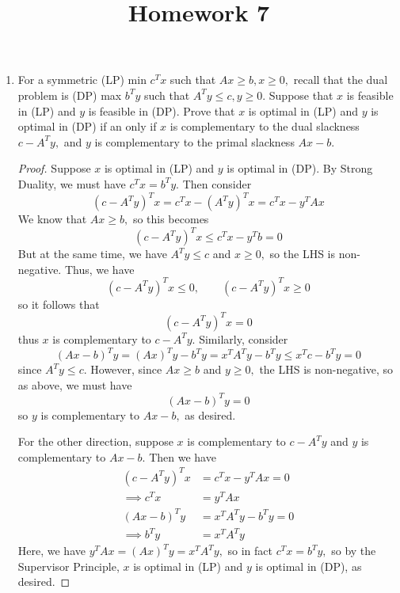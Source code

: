 \documentclass{article}
\begin{document}
\title{Homework 7}
\maketitle
\thispagestyle{fancy}

\begin{enumerate}
	\item For a symmetric (LP) min $c^T x$ such that $Ax\ge b, x\ge 0,$ recall that the dual problem is (DP) max $b^T y$ such that $A^T y\le c, y\ge 0.$ Suppose that $x$ is feasible in (LP) and $y$ is feasible in (DP). Prove that $x$ is optimal in (LP) and $y$ is optimal in (DP) if an only if $x$ is complementary to the dual slackness $c-A^T y,$ and $y$ is complementary to the primal slackness $Ax-b.$
		\begin{proof}
			Suppose $x$ is optimal in (LP) and $y$ is optimal in (DP). By Strong Duality, we must have $c^Tx = b^T y.$ Then consider \[(c-A^T y)^T x = c^Tx - (A^T y)^T x = c^T x - y^T Ax\] We know that $Ax\ge b,$ so this becomes \[(c-A^T y)^T x\le c^T x - y^Tb = 0\] But at the same time, we have $A^Ty\le c$ and $x\ge 0,$ so the LHS is non-negative. Thus, we have \[(c-A^T y)^T x \le 0, \quad\quad (c-A^Ty)^T x\ge 0\] so it follows that \[(c-A^Ty)^T x = 0\] thus $x$ is complementary to $c-A^T y.$
			Similarly, consider \[(Ax-b)^T y = (Ax)^Ty - b^T y = x^T A^T y - b^T y \le x^T c - b^T y = 0\] since $A^T y\le c.$ However, since $Ax\ge b$ and $y\ge 0,$ the LHS is non-negative, so as above, we must have \[(Ax-b)^T y = 0\] so $y$ is complementary to $Ax-b,$ as desired.

			For the other direction, suppose $x$ is complementary to $c-A^T y$ and $y$ is complementary to $Ax-b.$ Then we have
			\begin{align*}
				(c-A^T y)^T x &= c^T x - y^T Ax = 0 \\
				\implies c^T x &= y^T Ax \\
				(Ax-b)^T y&= x^T A^T y - b^T y = 0 \\
				\implies b^T y &= x^T A^T y
			\end{align*}
			Here, we have $y^T Ax = (Ax)^T y = x^T A^T y,$ so in fact $c^T x= b^T y,$ so by the Supervisor Principle, $x$ is optimal in (LP) and $y$ is optimal in (DP), as desired.

		\end{proof}


\end{enumerate}
\end{document}
